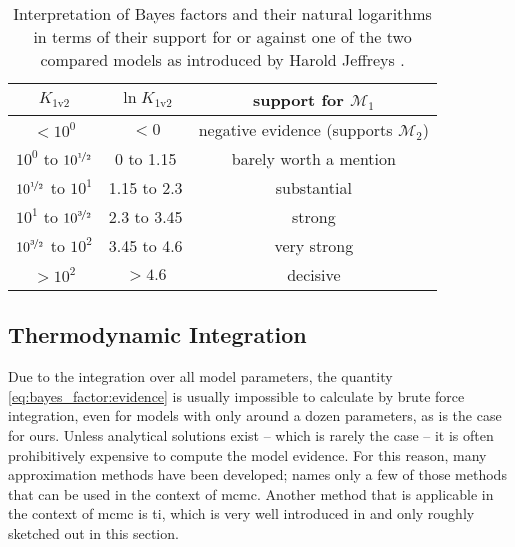 \documentclass[\relativeRoot/main.tex]{subfiles}
\begin{document}
\begin{table}
    \centering
    \begin{tabular}{ | c | c | c | }
        \hline
        $K_\text{1v2}$ & $\ln{K_\text{1v2}}$ & support for $\mathcal{M}_1$ \\
        \hline
        $< 10^0$ & $< 0$ & negative evidence (supports $\mathcal{M}_2$) \\
        $10^0$ to $10^{\nicefrac{1}{2}}$ & 0 to 1.15 & barely worth a mention \\
        $10^{\nicefrac{1}{2}}$ to $10^1$ & 1.15 to 2.3 & substantial \\
        $10^1$ to $10^{\nicefrac{3}{2}}$ & 2.3 to 3.45 & strong \\
        $10^{\nicefrac{3}{2}}$ to $10^2$ & 3.45 to 4.6 & very strong \\
        $> 10^2$ & $> 4.6$ & decisive \\
        \hline
    \end{tabular}
    \caption[Interpretation of ranges of Bayes factors]{Interpretation of Bayes factors and their natural logarithms in terms of their support for or against one of the two compared models as introduced by Harold Jeffreys \cite{jeffreys_theory_1998}.}
    \label{table:bayes_factor}
\end{table}

\subsection*{Thermodynamic Integration}
\label{subsec:graph:model_comp:thermo_int}

Due to the integration over all model parameters, the quantity \cref{eq:bayes_factor:evidence} is usually impossible to calculate by brute force integration, even for models with only around a dozen parameters, as is the case for ours. Unless analytical solutions exist -- which is rarely the case -- it is often prohibitively expensive to compute the model evidence. For this reason, many approximation methods have been developed; \cite{friel_estimating_2011} names only a few of those methods that can be used in the context of \gls{mcmc}. Another method that is applicable in the context of \gls{mcmc} is \gls{ti}, which is very well introduced in \cite{aponte_introduction_2022} and only roughly sketched out in this section.
\end{document}
